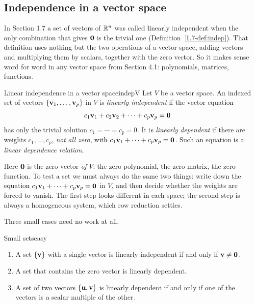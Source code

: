 \documentclass[11pt]{article}
\begin{document}
\subsection*{Independence in a vector space}

In Section 1.7 a set of vectors of $\mathbb{R}^n$ was called linearly independent when the only combination that gives $\mathbf{0}$ is the trivial one (Definition~\ref{1.7-def:indep}). That definition uses nothing but the two operations of a vector space, adding vectors and multiplying them by scalars, together with the zero vector. So it makes sense word for word in any vector space from Section 4.1: polynomials, matrices, functions.

\begin{defn}{Linear independence in a vector space}{indepV}
Let $V$ be a vector space. An indexed set of vectors $\{\mathbf{v}_1,\dots,\mathbf{v}_p\}$ in $V$ is \emph{linearly independent} if the vector equation
\[
c_1\mathbf{v}_1+c_2\mathbf{v}_2+\cdots+c_p\mathbf{v}_p=\mathbf{0}
\]
has only the trivial solution $c_1=\cdots=c_p=0$. It is \emph{linearly dependent} if there are weights $c_1,\dots,c_p$, \emph{not all zero}, with $c_1\mathbf{v}_1+\cdots+c_p\mathbf{v}_p=\mathbf{0}$. Such an equation is a \emph{linear dependence relation}.
\end{defn}

Here $\mathbf{0}$ is the zero vector \emph{of $V$}: the zero polynomial, the zero matrix, the zero function. To test a set we must always do the same two things: write down the equation $c_1\mathbf{v}_1+\cdots+c_p\mathbf{v}_p=\mathbf{0}$ in $V$, and then decide whether the weights are forced to vanish. The first step looks different in each space; the second step is always a homogeneous system, which row reduction settles.

Three small cases need no work at all.

\begin{thm}{Small sets}{easy}
\begin{enumerate}[label=(\alph*),itemsep=1pt]
  \item A set $\{\mathbf{v}\}$ with a single vector is linearly independent if and only if $\mathbf{v}\neq\mathbf{0}$.
  \item A set that contains the zero vector is linearly dependent.
  \item A set of two vectors $\{\mathbf{u},\mathbf{v}\}$ is linearly dependent if and only if one of the vectors is a scalar multiple of the other.
\end{enumerate}
\end{thm}
\end{document}
